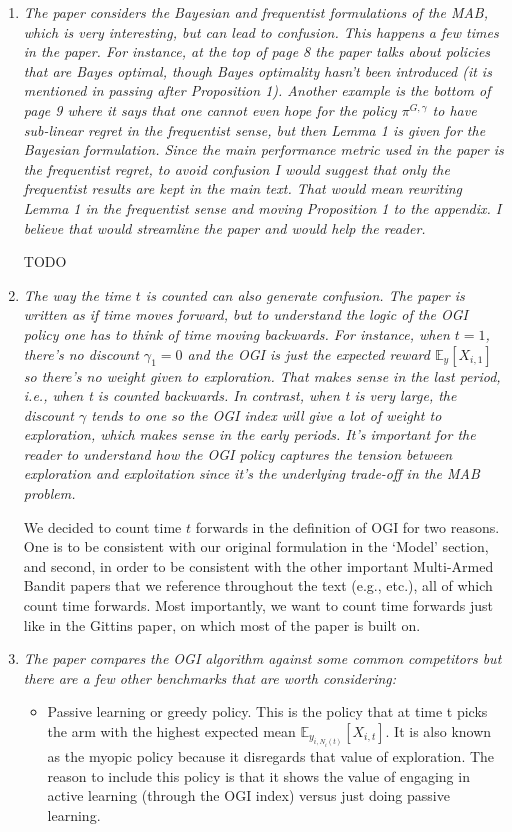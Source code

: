 \documentclass[11pt]{article}
\newcommand{\1}{\ensuremath{\mathbf{1}}} %
\theoremstyle{thm-sf}
\begin{document}
	\begin{enumerate}
		\item {\it The paper considers the Bayesian and frequentist formulations of the MAB, which is very interesting, but can lead to confusion. This happens a few times in the paper. For instance, at the top of page 8 the paper talks about policies that are Bayes optimal, though Bayes optimality hasn't been introduced (it is mentioned in passing after Proposition 1). Another example is the bottom of page 9 where it says that one cannot even hope for the policy $\pi^{G,\gamma}$ to have sub-linear regret in the frequentist sense, but then Lemma 1 is given for the Bayesian formulation. Since the main performance metric used in the paper is the frequentist regret, to avoid confusion I would suggest that only the frequentist results are kept in the main text. That would mean rewriting Lemma 1 in the frequentist sense and moving Proposition 1 to the appendix. I believe that would streamline the paper and would help the reader.}
		
		TODO
		
		\item {\it The way the time $t$ is counted can also generate confusion. The paper is written as if time moves forward, but to understand the logic of the OGI policy one has to think of time moving backwards. For instance, when $t = 1$, there's no discount $\gamma_1 = 0$ and the OGI is just the expected reward $\mathbb E_y [X_{i,1}]$ so there's no weight given to exploration. That makes sense in the last period, i.e., when t is counted backwards. In contrast, when t is very large, the discount $\gamma$ tends to one so the OGI index will give a lot of weight to exploration, which makes sense in the early periods. It's important for the reader to understand how the OGI policy captures the tension between exploration and exploitation since it's the underlying trade-off in the MAB problem.
		}
	
		We decided to count time $t$ forwards in the definition of OGI for two reasons. One is to be consistent with our original formulation in the `Model' section, and second, in order to be consistent with the other important Multi-Armed Bandit papers that we reference throughout the text (e.g., \cite{lai1985asymptotically,auer2002finite,gittins1979bandit} etc.), all of which count time forwards. Most importantly, we want to count time forwards just like in the Gittins paper, on which most of the paper is built on.
	
		\item {\it The paper compares the OGI algorithm against some common competitors but there are a few other benchmarks that are worth considering:
		\begin{itemize}
			\item Passive learning or greedy policy. This is the policy that at time t picks the arm with the highest expected mean $\mathbb E_{y_{i, N_i(t)}}[X_{i,t}]$. It is also known as the myopic policy because it disregards that value of exploration. The reason to include this policy is that it shows the value of engaging in active learning (through the OGI index) versus just doing passive learning.
			

\end{itemize}}
\end{enumerate}
\end{document}
